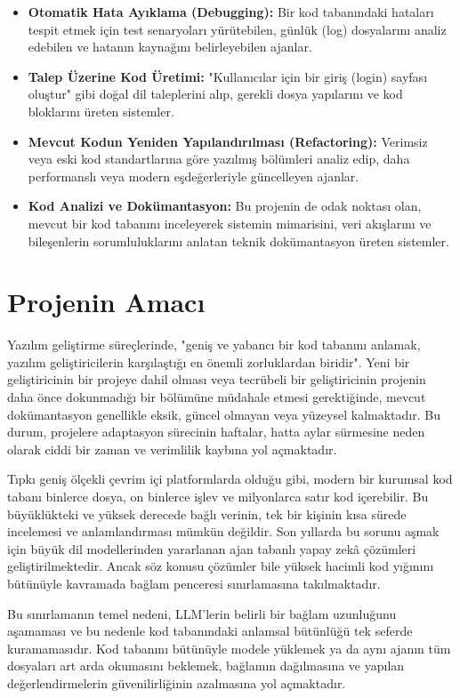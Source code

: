 \begin{itemize}
    \item \textbf{Otomatik Hata Ayıklama (Debugging):} Bir kod tabanındaki hataları tespit etmek için test senaryoları yürütebilen, günlük (log) dosyalarını analiz edebilen ve hatanın kaynağını belirleyebilen ajanlar.
    \item \textbf{Talep Üzerine Kod Üretimi:} "Kullanıcılar için bir giriş (login) sayfası oluştur" gibi doğal dil taleplerini alıp, gerekli dosya yapılarını ve kod bloklarını üreten sistemler.
    \item \textbf{Mevcut Kodun Yeniden Yapılandırılması (Refactoring):} Verimsiz veya eski kod standartlarına göre yazılmış bölümleri analiz edip, daha performanslı veya modern eşdeğerleriyle güncelleyen ajanlar.
    \item \textbf{Kod Analizi ve Dokümantasyon:} Bu projenin de odak noktası olan, mevcut bir kod tabanını inceleyerek sistemin mimarisini, veri akışlarını ve bileşenlerin sorumluluklarını anlatan teknik dokümantasyon üreten sistemler.
\end{itemize}

\section{Projenin Amacı}
\label{sec:proje-amaci}

Yazılım geliştirme süreçlerinde, "geniş ve yabancı bir kod tabanını anlamak, yazılım geliştiricilerin karşılaştığı en önemli zorluklardan biridir". Yeni bir geliştiricinin bir projeye dahil olması  veya tecrübeli bir geliştiricinin projenin daha önce dokunmadığı bir bölümüne müdahale etmesi gerektiğinde, mevcut dokümantasyon genellikle eksik, güncel olmayan veya yüzeysel kalmaktadır. Bu durum, projelere adaptasyon sürecinin haftalar, hatta aylar sürmesine neden olarak ciddi bir zaman ve verimlilik kaybına yol açmaktadır.

Tıpkı geniş ölçekli çevrim içi platformlarda olduğu gibi, modern bir kurumsal kod tabanı binlerce dosya, on binlerce işlev ve milyonlarca satır kod içerebilir. Bu büyüklükteki ve yüksek derecede bağlı verinin, tek bir kişinin kısa sürede incelemesi ve anlamlandırması mümkün değildir. Son yıllarda bu sorunu aşmak için büyük dil modellerinden yararlanan ajan tabanlı yapay zekâ çözümleri geliştirilmektedir. Ancak söz konusu çözümler bile yüksek hacimli kod yığınını bütünüyle kavramada bağlam penceresi sınırlamasına takılmaktadır.

Bu sınırlamanın temel nedeni, LLM'lerin belirli bir bağlam uzunluğunu aşamaması ve bu nedenle kod tabanındaki anlamsal bütünlüğü tek seferde kuramamasıdır. Kod tabanını bütünüyle modele yüklemek ya da aynı ajanın tüm dosyaları art arda okumasını beklemek, bağlamın dağılmasına ve yapılan değerlendirmelerin güvenilirliğinin azalmasına yol açmaktadır.

